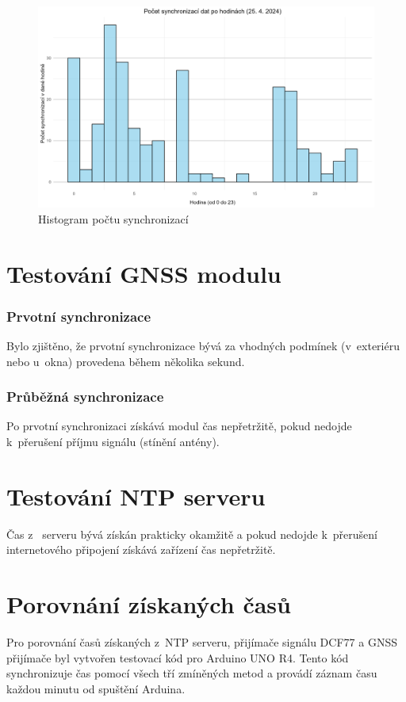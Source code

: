 \begin{figure}[H]
	\centering
	\includegraphics[width=12cm]{images/synchro_histogram.png}
	\caption{Histogram počtu synchronizací}
\end{figure}

\section{Testování GNSS modulu}

\subsubsection{Prvotní synchronizace}
Bylo zjištěno, že prvotní synchronizace bývá za vhodných podmínek (v~exteriéru nebo u~okna) provedena během několika sekund.

\subsubsection{Průběžná synchronizace}
Po prvotní synchronizaci získává modul čas nepřetržitě, pokud nedojde k~přerušení příjmu signálu (stínění antény).

\section{Testování NTP serveru}
Čas z~ serveru bývá získán prakticky okamžitě a pokud nedojde k~přerušení internetového připojení získává zařízení čas nepřetržitě.

\section{Porovnání získaných časů}
Pro porovnání časů získaných z~NTP serveru, přijímače signálu DCF77 a GNSS přijímače byl vytvořen testovací kód pro Arduino UNO R4. Tento kód synchronizuje čas pomocí všech tří zmíněných metod a provádí záznam času každou minutu od spuštění Arduina.

